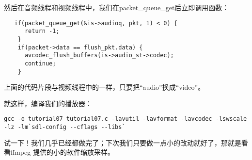 然后在音频线程和视频线程中，我们在packet_queue_get后立即调用函数：

\begin{lstlisting}
   if(packet_queue_get(&is->audioq, pkt, 1) < 0) {
      return -1;
    }
    if(packet->data == flush_pkt.data) {
      avcodec_flush_buffers(is->audio_st->codec);
      continue;
    }
\end{lstlisting}

上面的代码片段与视频线程中的一样，只要把“audio”换成“video”。

就这样，编译我们的播放器：

\begin{lstlisting}
gcc -o tutorial07 tutorial07.c -lavutil -lavformat -lavcodec -lswscale -lz -lm`sdl-config --cflags --libs`
\end{lstlisting}

试一下！我们几乎已经都做完了；下次我们只要做一点小的改动就好了，那就是看看ffmpeg 提供的小的软件缩放采样。

